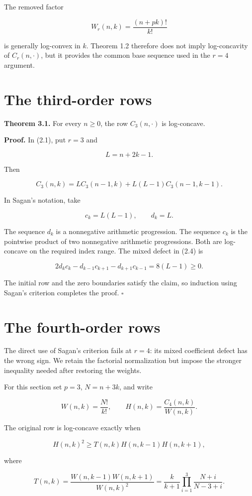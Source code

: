 \documentclass[11pt]{article}
\numberwithin{equation}{section}
\begin{document}
The removed factor

\[
W_r(n,k)=\frac{(n+pk)!}{k!}
\tag{2.8}
\]

is generally log-convex in $k$. Theorem 1.2 therefore does not imply log-concavity of
$C_r(n,\cdot)$, but it provides the common base sequence used in the $r=4$ argument.

\section{The third-order rows}


\textbf{Theorem 3.1.} For every $n\ge0$, the row $C_3(n,\cdot)$ is log-concave.

\textbf{Proof.} In (2.1), put $r=3$ and

\[
L=n+2k-1.
\]

Then

\[
C_3(n,k)=L C_3(n-1,k)+L(L-1)C_3(n-1,k-1).
\tag{3.1}
\]

In Sagan's notation, take

\[
c_k=L(L-1),\qquad d_k=L.
\]

The sequence $d_k$ is a nonnegative arithmetic progression. The sequence $c_k$ is the
pointwise product of two nonnegative arithmetic progressions. Both are log-concave on the
required index range. The mixed defect in (2.4) is

\[
2d_kc_k-d_{k-1}c_{k+1}-d_{k+1}c_{k-1}=8(L-1)\ge0.
\tag{3.2}
\]

The initial row and the zero boundaries satisfy the claim, so induction using Sagan's
criterion completes the proof. $\square$

\section{The fourth-order rows}


The direct use of Sagan's criterion fails at $r=4$: its mixed coefficient defect has the
wrong sign. We retain the factorial normalization but impose the stronger inequality needed
after restoring the weights.

For this section set $p=3$, $N=n+3k$, and write

\[
W(n,k)=\frac{N!}{k!},
\qquad
H(n,k)=\frac{C_4(n,k)}{W(n,k)}.
\]

The original row is log-concave exactly when

\[
H(n,k)^2\ge T(n,k)H(n,k-1)H(n,k+1),
\tag{4.1}
\]

where

\[
T(n,k)=\frac{W(n,k-1)W(n,k+1)}{W(n,k)^2}
=\frac{k}{k+1}\prod_{i=1}^{3}\frac{N+i}{N-3+i}.
\tag{4.2}
\]
\end{document}
